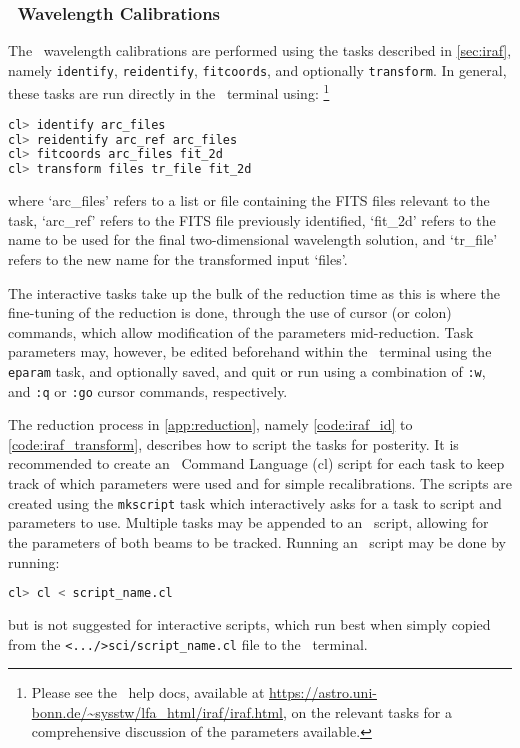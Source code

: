 \subsubsection{\iraf\ Wavelength Calibrations}

The \iraf\ wavelength calibrations are performed using the tasks described in \autoref{sec:iraf}, namely \texttt{identify}, \texttt{reidentify}, \texttt{fitcoords}, and optionally \texttt{transform}. In general, these tasks are run directly in the \iraf\ terminal using:%
\footnote{Please see the \iraf\ help docs, available at \url{https://astro.uni-bonn.de/~sysstw/lfa_html/iraf/iraf.html}, on the relevant tasks for a comprehensive discussion of the parameters available.}
\begin{lstlisting}[language=bash]
cl> identify arc_files
cl> reidentify arc_ref arc_files
cl> fitcoords arc_files fit_2d
cl> transform files tr_file fit_2d
\end{lstlisting}
{\parskip=0pt where} `arc\_files' refers to a list or file containing the \gls{FITS} files relevant to the task, `arc\_ref' refers to the \gls{FITS} file previously identified, `fit\_2d' refers to the name to be used for the final two-dimensional wavelength solution, and `tr\_file' refers to the new name for the transformed input `files'.

The interactive tasks take up the bulk of the reduction time as this is where the fine-tuning of the reduction is done, through the use of cursor (or colon) commands, which allow modification of the parameters mid-reduction. Task parameters may, however, be edited beforehand within the \iraf\ terminal using the \texttt{eparam} task, and optionally saved, and quit or run using a combination of \texttt{:w}, and \texttt{:q} or \texttt{:go} cursor commands, respectively.

The reduction process in \autoref{app:reduction}, namely \autoref{code:iraf_id} to \ref{code:iraf_transform}, describes how to script the tasks for posterity. It is recommended to create an \iraf\ Command Language (cl) script for each task to keep track of which parameters were used and for simple recalibrations. The scripts are created using the \texttt{mkscript} task which interactively asks for a task to script and parameters to use. Multiple tasks may be appended to an \iraf\ script, allowing for the parameters of both beams to be tracked. Running an \iraf\ script may be done by running:
\begin{lstlisting}[language=bash]
cl> cl < script_name.cl
\end{lstlisting}
{\parskip=0pt but} is not suggested for interactive scripts, which run best when simply copied from the \texttt{<.../>sci/script\_name.cl} file to the \iraf\ terminal.

